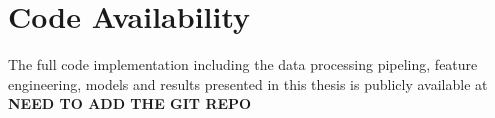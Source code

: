 \section*{Code Availability}

The full code implementation including the data processing pipeling, feature engineering, models and results presented in this thesis is publicly available at \textbf{NEED TO ADD THE GIT REPO}